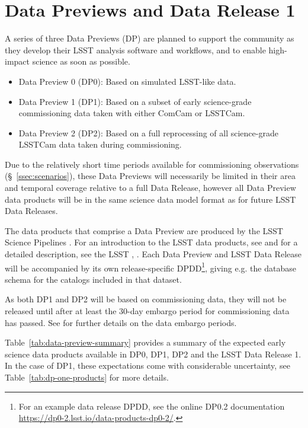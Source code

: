 \section{Data Previews and Data Release 1} 
\label{sec:datapreview}

A series of three Data Previews (DP) are planned  to support the community as they develop their LSST analysis software and workflows, and to enable high-impact science as soon as possible.
\begin{itemize}
\item Data Preview 0 (DP0): Based on simulated LSST-like data.
\item Data Preview 1 (DP1): Based on a subset of early science-grade commissioning data taken with either ComCam or LSSTCam.
\item Data Preview 2 (DP2): Based on a full reprocessing of all science-grade LSSTCam data taken during commissioning.
\end{itemize}

Due to the relatively short time periods available for commissioning observations (\S~\ref{ssec:scenarios}), these Data Previews will necessarily be limited in their area and temporal coverage relative to  a full Data Release, however all Data Preview data products will be in the same science data model format as for future LSST Data Releases.

The data products that comprise a Data Preview are produced by the LSST Science Pipelines \citep{2019ASPC..523..521B,2018PASJ...70S...5B}.
For an introduction to the LSST data products, see \citet{RubinDataProductsAbridged} and for a detailed description, see the LSST \dpdd{},  .
Each Data Preview and LSST Data Release will be accompanied by its own release-specific DPDD\footnote{For an example data release DPDD, see the online DP0.2 documentation {\url{https://dp0-2.lsst.io/data-products-dp0-2/}}.}, giving e.g. the  database schema for the catalogs included in that dataset.

As both DP1 and DP2 will be based on commissioning data, they will not be released until after at least the 30-day embargo period for commissioning data has passed.
See  for further details on the data embargo periods.

Table~\ref{tab:data-preview-summary} provides a summary of the expected early science data products available in DP0, DP1, DP2 and the LSST Data Release 1.
In the case of DP1, these expectations come with considerable uncertainty, see Table~\ref{tab:dp-one-products} for more details.

